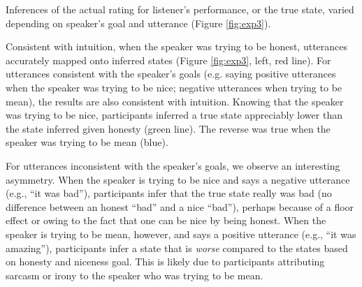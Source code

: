 \documentclass[10pt,letterpaper]{article}
\begin{document}
Inferences of the actual rating for listener's performance, or the true state, varied depending on speaker's goal and utterance (Figure \ref{fig:exp3}).


Consistent with intuition, when the speaker was trying to be honest, utterances accurately mapped onto inferred states (Figure \ref{fig:exp3}, left, red line).
For utterances consistent with the speaker's goals (e.g. saying positive utterances when the speaker was trying to be nice; negative utterances when trying to be mean), the results are also consistent with intuition.
Knowing that the speaker was trying to be nice, participants inferred a true state appreciably lower than the state inferred given honesty (green line).
The reverse was true when the speaker was trying to be mean (blue).


For utterances inconsistent with the speaker's goals, we observe an interesting asymmetry.
When the speaker is trying to be nice and says a negative utterance (e.g., ``it was bad''), participants infer that the true state really was bad (no difference between an honest ``bad'' and a nice ``bad''), perhaps because of a floor effect or owing to the fact that one can be nice by being honest.
When the speaker is trying to be mean, however, and says a positive utterance (e.g., ``it was amazing''), participants infer a state that is \emph{worse} compared to the states based on honesty and niceness goal.
This is likely due to participants attributing sarcasm or irony to the speaker who was trying to be mean.

\end{document}
